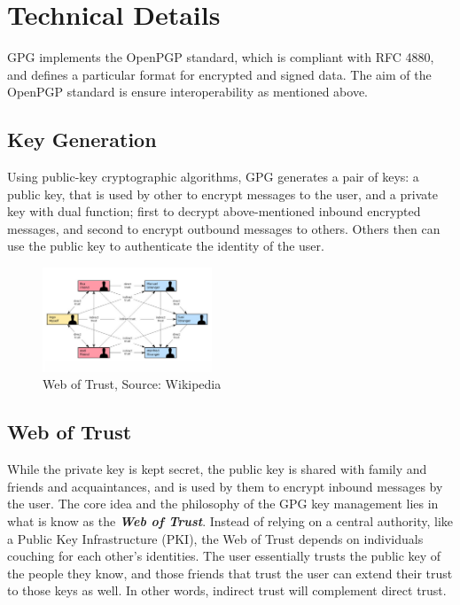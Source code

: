 \documentclass[twoside,twocolumn]{article}
\begin{document}
\section*{Technical Details}
GPG implements the OpenPGP standard, which is compliant with RFC 4880\cite{rfc4880},
and defines a particular format for encrypted and signed data.
The aim of the OpenPGP standard is ensure interoperability as mentioned above.

\subsection*{Key Generation}
Using public-key cryptographic algorithms, GPG generates a pair of keys: a public key, that is used by other
to encrypt messages to the user, and a private key with dual function;
first to decrypt above-mentioned inbound encrypted messages, and second to encrypt outbound messages to others.
Others then can use the public key to authenticate the identity of the user\cite{wikiGPG}.



\begin{figure}
\centering
  \includegraphics[width=0.45\textwidth]{i/weboftrust.jpg}
  \caption{Web of Trust, Source: Wikipedia}
\end{figure}


\subsection*{Web of Trust}

While the private key is kept secret,
the public key is shared with family and friends and acquaintances, and
is used by them to encrypt inbound messages by the user.
The core idea and the philosophy of the GPG key management lies in what is know as
the \textbf{\textit{Web of Trust}}\cite{weboftrust}.
Instead of relying on a central authority, like a Public Key Infrastructure (PKI),
the Web of Trust depends on individuals couching for each other's identities. 
The user essentially trusts the public key of the people they know,
and those friends that trust the user can extend their trust to those keys as well.
In other words, indirect trust will complement direct trust.
\end{document}
